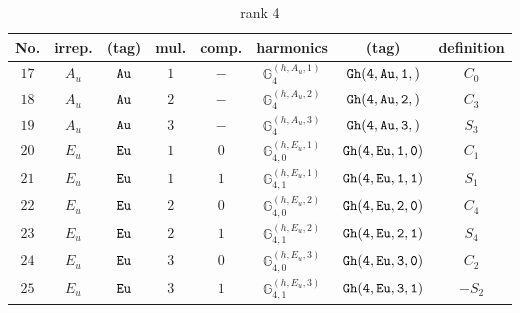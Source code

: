 \documentclass[fleqn,8pt]{jsarticle}
\begin{document}
\begin{table}[ht!]
\begin{center}
\caption{rank 4}
\renewcommand{\arraystretch}{1.3}
\begin{tabular}{cccccccc} \hline \hline
No. & irrep. & (tag) & mul. & comp. & harmonics & (tag) & definition \\ \hline
$ 17 $ & $ A_{u} $ & $ {\tt Au} $ & $ 1 $ & $ - $ & $ \mathbb{G}_{4}^{(h,A_{u},1)} $ & $ {\tt Gh(4,Au,1,)} $ & $ C_{0} $ \\
$ 18 $ & $ A_{u} $ & $ {\tt Au} $ & $ 2 $ & $ - $ & $ \mathbb{G}_{4}^{(h,A_{u},2)} $ & $ {\tt Gh(4,Au,2,)} $ & $ C_{3} $ \\
$ 19 $ & $ A_{u} $ & $ {\tt Au} $ & $ 3 $ & $ - $ & $ \mathbb{G}_{4}^{(h,A_{u},3)} $ & $ {\tt Gh(4,Au,3,)} $ & $ S_{3} $ \\
$ 20 $ & $ E_{u} $ & $ {\tt Eu} $ & $ 1 $ & $ 0 $ & $ \mathbb{G}_{4,0}^{(h,E_{u},1)} $ & $ {\tt Gh(4,Eu,1,0)} $ & $ C_{1} $ \\
$ 21 $ & $ E_{u} $ & $ {\tt Eu} $ & $ 1 $ & $ 1 $ & $ \mathbb{G}_{4,1}^{(h,E_{u},1)} $ & $ {\tt Gh(4,Eu,1,1)} $ & $ S_{1} $ \\
$ 22 $ & $ E_{u} $ & $ {\tt Eu} $ & $ 2 $ & $ 0 $ & $ \mathbb{G}_{4,0}^{(h,E_{u},2)} $ & $ {\tt Gh(4,Eu,2,0)} $ & $ C_{4} $ \\
$ 23 $ & $ E_{u} $ & $ {\tt Eu} $ & $ 2 $ & $ 1 $ & $ \mathbb{G}_{4,1}^{(h,E_{u},2)} $ & $ {\tt Gh(4,Eu,2,1)} $ & $ S_{4} $ \\
$ 24 $ & $ E_{u} $ & $ {\tt Eu} $ & $ 3 $ & $ 0 $ & $ \mathbb{G}_{4,0}^{(h,E_{u},3)} $ & $ {\tt Gh(4,Eu,3,0)} $ & $ C_{2} $ \\
$ 25 $ & $ E_{u} $ & $ {\tt Eu} $ & $ 3 $ & $ 1 $ & $ \mathbb{G}_{4,1}^{(h,E_{u},3)} $ & $ {\tt Gh(4,Eu,3,1)} $ & $ - S_{2} $ \\
 \hline \hline
\end{tabular}
\end{center}
\end{table}
\end{document}
